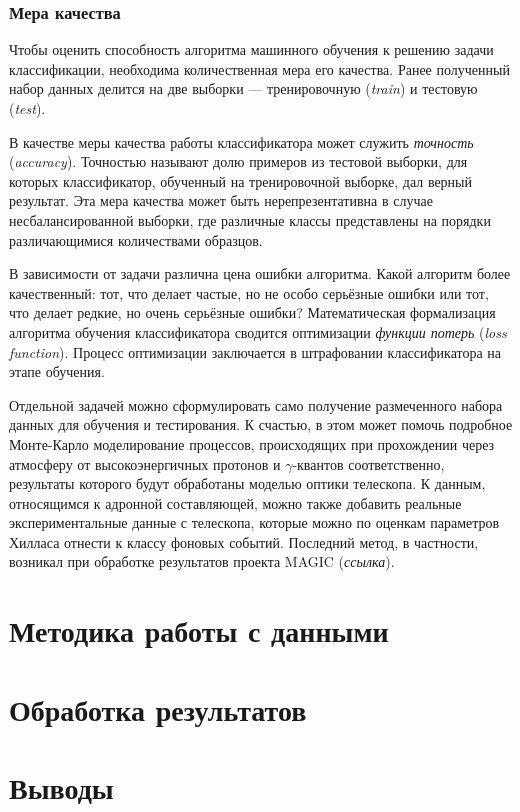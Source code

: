 \documentclass[magd,floatypics,numeref]{msudipl} %
\begin{document}
\subsection{Мера качества}
Чтобы оценить способность алгоритма машинного обучения к решению задачи классификации, необходима количественная мера его качества. Ранее полученный набор данных делится на две выборки --- тренировочную (\textit{train}) и тестовую (\textit{test}). 

В качестве меры качества работы классификатора может служить \textit{точность} (\textit{accuracy}). Точностью называют долю примеров из тестовой выборки, для которых классификатор, обученный на тренировочной выборке, дал верный результат.  Эта мера качества может быть нерепрезентативна в случае несбалансированной выборки, где различные классы представлены на порядки различающимися количествами образцов. 

В зависимости от задачи различна цена ошибки алгоритма. Какой алгоритм более качественный: тот, что делает частые, но не особо серьёзные ошибки или тот, что делает редкие, но очень серьёзные ошибки? Математическая формализация алгоритма обучения классификатора сводится оптимизации \textit{функции потерь} (\textit{loss function}). Процесс оптимизации заключается в штрафовании классификатора на этапе обучения.

Отдельной задачей можно сформулировать само получение размеченного набора данных для обучения и тестирования. К счастью, в этом может помочь подробное Монте-Карло моделирование процессов, происходящих при прохождении через атмосферу от высокоэнергичных протонов и $\gamma$-квантов соответственно, результаты которого будут обработаны моделью оптики телескопа. К данным, относящимся к адронной составляющей, можно также добавить реальные экспериментальные данные с телескопа, которые можно по оценкам параметров Хилласа отнести к классу фоновых событий. Последний метод, в частности, возникал при обработке результатов проекта MAGIC (\textit{ссылка}).




\chapter{Методика работы с данными}
\chapter{Обработка результатов}

\chapter*{Выводы}   %


{}  %
\printbibliography[title=Литература]
\end{document}

